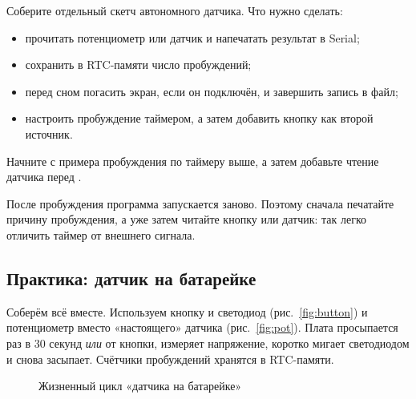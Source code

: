 Соберите отдельный скетч автономного датчика. Что нужно сделать:
\begin{itemize}
  \item прочитать потенциометр или датчик и напечатать результат в Serial;
  \item сохранить в RTC-памяти число пробуждений;
  \item перед сном погасить экран, если он подключён, и завершить запись в файл;
  \item настроить пробуждение таймером, а затем добавить кнопку как второй источник.
\end{itemize}

Начните с примера пробуждения по таймеру выше, а затем добавьте чтение датчика перед
.

\begin{tip}
После пробуждения программа запускается заново. Поэтому сначала печатайте причину пробуждения,
а уже затем читайте кнопку или датчик: так легко отличить таймер от внешнего сигнала.
\end{tip}

\subsection{Практика: датчик на батарейке}

Соберём всё вместе. Используем кнопку и светодиод (рис.~\ref{fig:button}) и потенциометр вместо
«настоящего» датчика (рис.~\ref{fig:pot}). Плата просыпается раз в 30 секунд \emph{или} от кнопки,
измеряет напряжение, коротко мигает светодиодом и снова засыпает. Счётчики пробуждений хранятся в RTC-памяти.

\begin{figure}[H]
\centering
{}
\caption{Жизненный цикл «датчика на батарейке»}
\end{figure}

